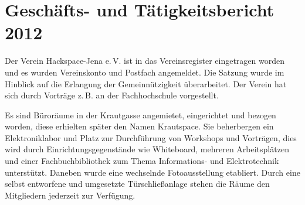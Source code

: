 \documentclass[10pt, a4paper]{scrartcl}
\begin{document}
\section*{Geschäfts- und Tätigkeitsbericht 2012}
Der Verein Hackspace-Jena e.\,V. ist in das Vereinsregister eingetragen worden und
es wurden Vereinskonto und Postfach angemeldet.
Die Satzung wurde im Hinblick auf die Erlangung der Gemeinnützigkeit überarbeitet.
Der Verein hat sich durch Vorträge z.\,B. an der Fachhochschule vorgestellt.

Es sind Büroräume in der Krautgasse angemietet, eingerichtet und bezogen worden,
diese erhielten später den Namen Krautspace.
Sie beherbergen ein Elektroniklabor und Platz zur Durchführung von Workshops und Vorträgen,
dies wird durch Einrichtungsgegenstände wie Whiteboard, mehreren Arbeitsplätzen und einer 
Fachbuchbibliothek zum Thema Informations- und Elektrotechnik unterstützt.
Daneben wurde eine wechselnde Fotoausstellung etabliert.
Durch eine selbst entworfene und umgesetzte Türschließanlage stehen die Räume den Mitgliedern jederzeit zur Verfügung. 
\end{document}
